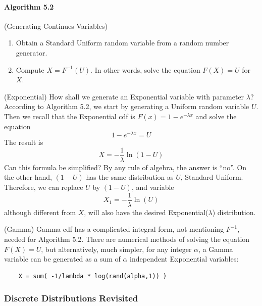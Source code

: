 \begin{multicols}{2}
\paragraph{Algorithm 5.2} (Generating Continues Variables)
\begin{enumerate}
  \item Obtain a Standard Uniform random variable from a random number generator.
  \item  Compute $X = F^{-1}(U)$. In other words, solve the equation $F(X) = U$ for $X$.
\end{enumerate}

\vspace*{\fill}
\columnbreak

\begin{example}{ (Exponential)}
  How shall we generate an Exponential variable with parameter $\lambda$? According to Algorithm 5.2, we start by generating a Uniform random variable $U$. Then we recall that the Exponential cdf is $F(x) = 1 - e^{-\lambda x}$ and solve the equation
  \begin{equation*}
    1 - e^{-\lambda x} = U
  \end{equation*}
  The result is
  \begin{equation}
    X = - \frac{1}{\lambda} \ln(1-U)
  \end{equation}
  Can this formula be simplified? By any rule of algebra, the answer is ``no''. On the other hand, $(1 - U)$ has the same distribution as $U$, Standard Uniform. Therefore, we can replace $U$ by $(1 - U)$, and variable
  \begin{equation}
    X_1 = - \frac{1}{\lambda} \ln(U)
  \end{equation}
  although different from $X$, will also have the desired Exponential($\lambda$) distribution.
\end{example}

\begin{example}{ (Gamma)}
  Gamma cdf has a complicated integral form, not mentioning $F^{-1}$, needed for Algorithm 5.2. There are numerical methods of solving the equation $F(X) = U$, but alternatively, much simpler, for any integer $\alpha$, a Gamma variable can be generated as a sum of $\alpha$ independent Exponential variables:
  \begin{verbatim}
    X = sum( -1/lambda * log(rand(alpha,1)) )    
  \end{verbatim}
\end{example}

\subsubsection{Discrete Distributions Revisited}


\end{multicols}
